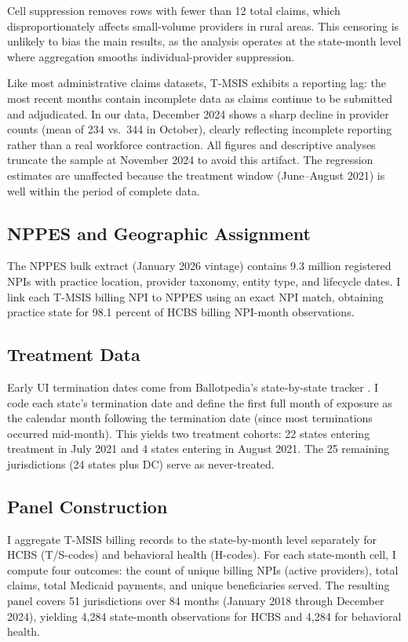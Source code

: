 \documentclass[12pt]{article}
\begin{document}
Cell suppression removes rows with fewer than 12 total claims, which disproportionately affects small-volume providers in rural areas. This censoring is unlikely to bias the main results, as the analysis operates at the state-month level where aggregation smooths individual-provider suppression.

Like most administrative claims datasets, T-MSIS exhibits a reporting lag: the most recent months contain incomplete data as claims continue to be submitted and adjudicated. In our data, December 2024 shows a sharp decline in provider counts (mean of 234 vs.\ 344 in October), clearly reflecting incomplete reporting rather than a real workforce contraction. All figures and descriptive analyses truncate the sample at November 2024 to avoid this artifact. The regression estimates are unaffected because the treatment window (June--August 2021) is well within the period of complete data.

\subsection{NPPES and Geographic Assignment}

The NPPES bulk extract (January 2026 vintage) contains 9.3 million registered NPIs with practice location, provider taxonomy, entity type, and lifecycle dates. I link each T-MSIS billing NPI to NPPES using an exact NPI match, obtaining practice state for 98.1 percent of HCBS billing NPI-month observations.

\subsection{Treatment Data}

Early UI termination dates come from Ballotpedia's state-by-state tracker \citep{ballotpedia2021}. I code each state's termination date and define the first full month of exposure as the calendar month following the termination date (since most terminations occurred mid-month). This yields two treatment cohorts: 22 states entering treatment in July 2021 and 4 states entering in August 2021. The 25 remaining jurisdictions (24 states plus DC) serve as never-treated.

\subsection{Panel Construction}

I aggregate T-MSIS billing records to the state-by-month level separately for HCBS (T/S-codes) and behavioral health (H-codes). For each state-month cell, I compute four outcomes: the count of unique billing NPIs (active providers), total claims, total Medicaid payments, and unique beneficiaries served. The resulting panel covers 51 jurisdictions over 84 months (January 2018 through December 2024), yielding 4,284 state-month observations for HCBS and 4,284 for behavioral health.
\end{document}
